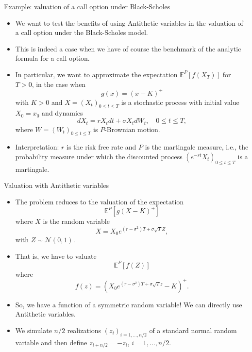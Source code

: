 \documentclass[9 pt]{beamer} %
\def \bE {\mathbb{E}}
\begin{document}
\begin{frame}{Example: valuation of a call option  under Black-Scholes}
\begin{itemize}
\item We want to test the benefits of using Antithetic variables in the valuation of a call option under the Black-Scholes model.
\item This is indeed a case when we have of course the benchmark of the analytic formula for a call option.
\item In particular, we want to approximate the expectation $\bE^P[f(X_T)]$ for $T>0$, in the case when
$$
g(x)=(x-K)^+
$$
with $K>0$ and $X=(X_t)_{0 \le t \le T}$ is a stochastic process with initial value $X_0=x_0$ and dynamics
$$
dX_t = r X_t dt + \sigma X_t dW_t, \quad 0 \le t \le T,
$$
where $W=(W_t)_{0 \le t \le T}$ is $P$-Brownian motion.
\item Interpretation: $r$ is the risk free rate and $P$ is the martingale measure, i.e., the probability measure under which the discounted process $(e^{-r t}X_t)_{0 \le t \le T}$ is a martingale.
\end{itemize}
\end{frame}


\begin{frame}{Valuation with Antithetic variables}
\begin{itemize}
\item The problem reduces to the valuation of the expectation
$$
\bE^P[g(X-K)^+]
$$
where $X$ is the random variable
$$
X = X_0 e^{(r-\sigma^2)T + \sigma \sqrt{T} Z},
$$
with $ Z \sim \mathcal{N}(0,1)$.
\item That is, we have to valuate 
$$
\bE^P\left[f(Z)\right]
$$
where
$$
f(z)=\left(X_0 e^{(r-\sigma^2)T + \sigma \sqrt{T} z} - K \right)^+.
$$
\item So, we have a function of a symmetric random variable! We can directly use Antithetic variables.
\item We simulate $n/2$ realizations $(z_i)_{i=1,\dots,n/2}$ of a standard normal random variable and then define $z_{i+n/2}=-z_i$, $i=1,\dots,n/2$.
\end{itemize}
\end{frame}
\end{document}
